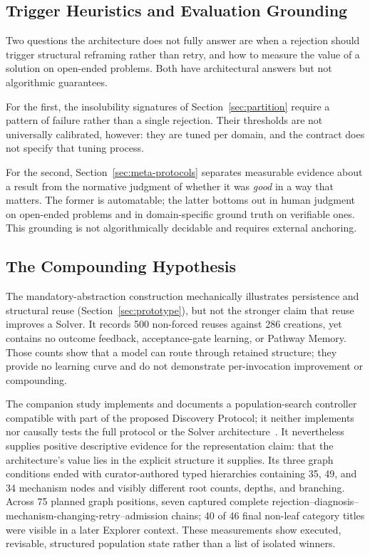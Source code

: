 \documentclass[11pt]{article}
\begin{document}
\subsection{Trigger Heuristics and Evaluation Grounding}
\label{sec:trigger-and-value}

Two questions the architecture does not fully answer are when a rejection should trigger structural reframing rather than retry, and how to measure the value of a solution on open-ended problems. Both have architectural answers but not algorithmic guarantees.

For the first, the insolubility signatures of Section~\ref{sec:partition} require a pattern of failure rather than a single rejection. Their thresholds are not universally calibrated, however: they are tuned per domain, and the contract does not specify that tuning process.

For the second, Section~\ref{sec:meta-protocols} separates measurable evidence about a result from the normative judgment of whether it was \emph{good} in a way that matters. The former is automatable; the latter bottoms out in human judgment on open-ended problems and in domain-specific ground truth on verifiable ones. This grounding is not algorithmically decidable and requires external anchoring.

\subsection{The Compounding Hypothesis}

The mandatory-abstraction construction mechanically illustrates persistence and structural reuse (Section~\ref{sec:prototype}), but not the stronger claim that reuse improves a Solver. It records 500 non-forced reuses against 286 creations, yet contains no outcome feedback, acceptance-gate learning, or Pathway Memory. Those counts show that a model can route through retained structure; they provide no learning curve and do not demonstrate per-invocation improvement or compounding.

The companion study implements and documents a population-search controller compatible with part of the proposed Discovery Protocol; it neither implements nor causally tests the full protocol or the Solver architecture~\cite{westerberg2026ontology}. It nevertheless supplies positive descriptive evidence for the representation claim: that the architecture's value lies in the explicit structure it supplies. Its three graph conditions ended with curator-authored typed hierarchies containing 35, 49, and 34 mechanism nodes and visibly different root counts, depths, and branching. Across 75 planned graph positions, seven captured complete rejection--diagnosis--mechanism-changing-retry--admission chains; 40 of 46 final non-leaf category titles were visible in a later Explorer context. These measurements show executed, revisable, structured population state rather than a list of isolated winners.
\end{document}
